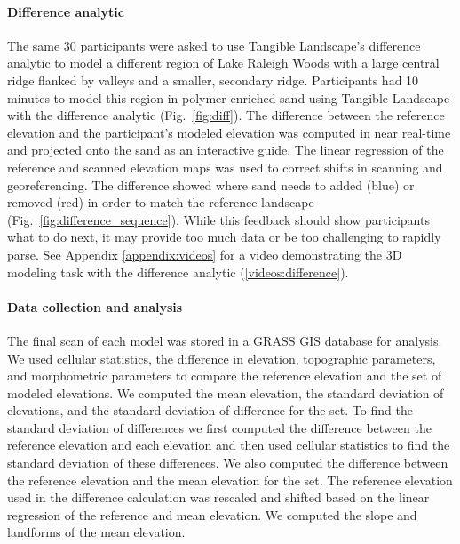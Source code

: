 \documentclass[prodmode,acmtochi]{acmsmall} %
\begin{document}
\paragraph{Difference analytic}
The same 30 participants were asked to use 
Tangible Landscape's difference analytic to model 
a different region of Lake Raleigh Woods
with a large central ridge 
flanked by valleys 
and a smaller, secondary ridge.
Participants had 10 minutes to model this region
in polymer-enriched sand using Tangible Landscape 
with the difference analytic (Fig.~\ref{fig:diff}). 
The difference between the reference elevation 
and the participant's modeled elevation %
was computed in near real-time and projected onto the sand 
as an interactive guide.
The linear regression of the reference and scanned elevation maps was used
to correct shifts in scanning and georeferencing. 
The difference showed where sand needs to added (blue) or removed (red) 
in order to match the reference landscape (Fig.~\ref{fig:difference_sequence}). 
While this feedback should show participants what to do next, 
it may provide too much data or be too challenging to rapidly parse.
%
See Appendix \ref{appendix:videos}
for a video demonstrating the 3D modeling task with the difference analytic (\ref{videos:difference}).


\paragraph{Data collection and analysis}
The final scan of each model was stored in a GRASS GIS database for analysis. 
We used cellular statistics, the difference in elevation, 
topographic parameters, and morphometric parameters
to compare the reference elevation and the set of modeled elevations. 
We computed 
the mean elevation,
the standard deviation of elevations, 
and the standard deviation of difference for the set.
To find the standard deviation of differences 
we first computed the difference between the reference elevation and each elevation 
and then used cellular statistics to find the standard deviation of these differences.
We also computed the difference between the 
reference elevation and the mean elevation for the set. 
The reference elevation used in the difference calculation was rescaled and shifted based on the linear regression of the reference and mean elevation.
We computed the slope and landforms of the mean elevation. 
\end{document}
